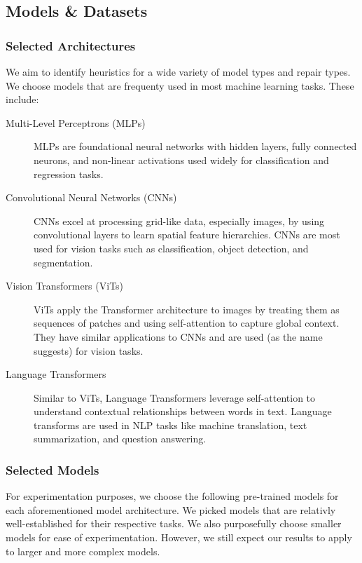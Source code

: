 \documentclass{article}
\begin{document}
\subsection{Models \& Datasets}

\subsubsection{Selected Architectures}
We aim to identify heuristics for a wide variety of model types and repair types.
We choose models that are frequenty used in most machine learning tasks.
These include:

\begin{description}
	\item[Multi-Level Perceptrons (MLPs)] {
		MLPs are foundational neural networks with hidden layers, fully connected neurons, and non-linear activations used widely for classification and regression tasks.
		}
	\item[Convolutional Neural Networks (CNNs)] {
		CNNs excel at processing grid-like data, especially images, by using convolutional layers to learn spatial feature hierarchies.
		CNNs are most used for vision tasks such as classification, object detection, and segmentation.
		}
	\item[Vision Transformers (ViTs)] {
		ViTs apply the Transformer architecture to images by treating them as sequences of patches and using self-attention to capture global context.
		They have similar applications to CNNs and are used (as the name suggests) for vision tasks.
		}
	\item[Language Transformers] {
		Similar to ViTs, Language Transformers leverage self-attention to understand contextual relationships between words in text.
		Language transforms are used in NLP tasks like machine translation, text summarization, and question answering.
		}
\end{description}

\subsubsection{Selected Models}

For experimentation purposes, we choose the following pre-trained models for each aforementioned model architecture.
We picked models that are relativly well-established for their respective tasks.
We also purposefully choose smaller models for ease of experimentation.
However, we still expect our results to apply to larger and more complex models.
\end{document}
